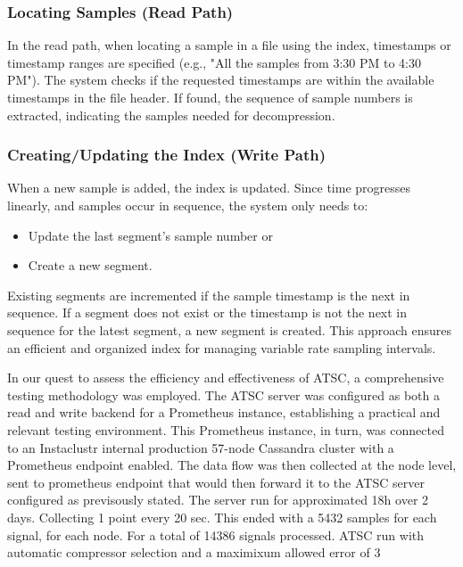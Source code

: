 \documentclass[conference]{IEEEtran}
\begin{document}
\subsubsection{Locating Samples (Read Path)}

In the read path, when locating a sample in a file using the index, timestamps or timestamp ranges are specified (e.g., "All the samples from 3:30 PM to 4:30 PM"). The system checks if the requested timestamps are within the available timestamps in the file header. If found, the sequence of sample numbers is extracted, indicating the samples needed for decompression.
\vspace{5pt}
\subsubsection{Creating/Updating the Index (Write Path)}

When a new sample is added, the index is updated. Since time progresses linearly, and samples occur in sequence, the system only needs to:
\begin{itemize}
    \item Update the last segment's sample number or
    \item Create a new segment.
\end{itemize}

Existing segments are incremented if the sample timestamp is the next in sequence. If a segment does not exist or the timestamp is not the next in sequence for the latest segment, a new segment is created. This approach ensures an efficient and organized index for managing variable rate sampling intervals.


In our quest to assess the efficiency and effectiveness of ATSC, a comprehensive testing methodology was employed. The ATSC server was configured as both a read and write backend for a Prometheus instance, establishing a practical and relevant testing environment. This Prometheus instance, in turn, was connected to an Instaclustr internal production 57-node Cassandra cluster with a Prometheus endpoint enabled. 
The data flow was then collected at the node level, sent to prometheus endpoint that would then forward it to the ATSC server configured as previsously stated.
The server run for approximated 18h over 2 days. Collecting 1 point every 20 sec. This ended with a 5432 samples for each signal, for each node. For a total of 14386 signals processed.
ATSC run with automatic compressor selection and a maximixum allowed error of 3\\%
\end{document}
